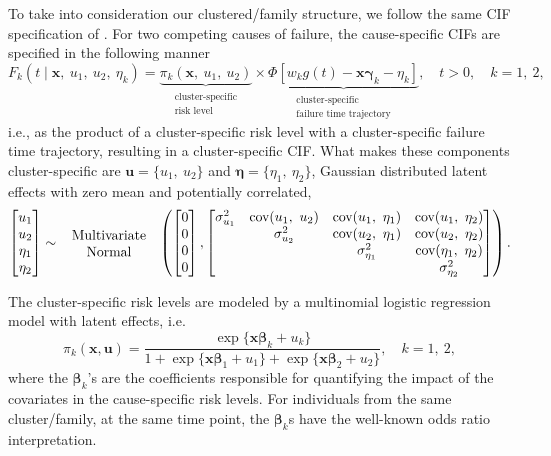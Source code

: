 \documentclass[a4paper,12pt]{article}
\begin{document}
To take into consideration our clustered/family structure, we follow the
same CIF specification of \cite{SCHEIKE}. For two competing causes of
failure, the cause-specific CIFs are specified in the following manner
\begin{equation}
 F_{k} (t \mid \bm{x},~u_{1},~u_{2},~\eta_{k}) =
 \underbrace{\pi_{k}(\bm{x},~u_{1},~u_{2})}_{
 \substack{\text{cluster-specific}\\\text{risk level}}}\times
  \underbrace{\Phi[w_{k} g(t) - \bm{x}\bm{\gamma}_{k} - \eta_{k}]}_{
   \substack{\text{cluster-specific}\\\text{failure time trajectory}}
  }, \quad t > 0, \quad k = 1,~2,
  \label{eq:cif}
\end{equation}
i.e., as the product of a cluster-specific risk level with a
cluster-specific failure time trajectory, resulting in a
cluster-specific CIF. What makes these components cluster-specific are
\(\bm{u} = \{u_{1},~u_{2}\}\) and \(\bm{\eta} =
\{\eta_{1},~\eta_{2}\}\), Gaussian distributed latent effects with zero
mean and potentially correlated,
\[
 \begin{bmatrix} u_{1}\\u_{2}\\\eta_{1}\\\eta_{2} \end{bmatrix} \sim
 \parbox{2.5cm}{\centering Multivariate Normal}
 \left(
  \begin{bmatrix} 0\\0\\0\\0\end{bmatrix},
  \begin{bmatrix}
   \sigma_{u_{1}}^{2}&
   \text{cov}(u_{1},~u_{2})&
   \text{cov}(u_{1},~\eta_{1})&\text{cov}(u_{1},~\eta_{2})\\
   &\sigma_{u_{2}}^{2}&
   \text{cov}(u_{2},~\eta_{1})&\text{cov}(u_{2},~\eta_{2})\\
   &&\sigma_{\eta_{1}}^{2}&\text{cov}(\eta_{1},~\eta_{2})\\
   &&&\sigma_{\eta_{2}}^{2}
  \end{bmatrix}
 \right).
 \]

The cluster-specific risk levels are modeled by a multinomial logistic
regression model with latent effects, i.e.
\begin{equation}
 \pi_{k}(\bm{x}, \bm{u}) =
 \frac{\exp\{\bm{x}\bm{\beta}_{k} + u_{k}\}}{1 +
  \exp\{\bm{x}\bm{\beta}_{1} + u_{1}\} +
  \exp\{\bm{x}\bm{\beta}_{2} + u_{2}\}}, \quad k = 1,~2,
 \label{eq:risklevel}
\end{equation}
where the \(\bm{\beta}_{k}\)'s are the coefficients responsible for
quantifying the impact of the covariates in the cause-specific risk
levels. For individuals from the same cluster/family, at the same time
point, the \(\bm{\beta}_{k}\)s have the well-known odds ratio
interpretation.
\end{document}
